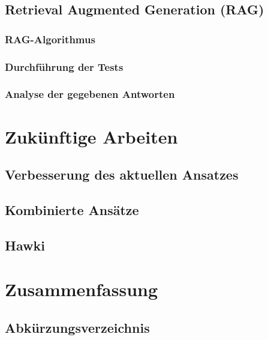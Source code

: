 \documentclass[german,report]{i1thesis}
\begin{document}
\subsection{Retrieval Augmented Generation (RAG)}%
\label{subsec:rag}




\subsubsection{RAG-Algorithmus}%
\label{subsec:rag-alg}

\subsubsection{Durchführung der Tests}%
\label{subsec:durchfuehrung-der-tests-rag}


\subsubsection{Analyse der gegebenen Antworten}%
\label{subsec:analyse-der-gegebenen-antworten-rag}



\section{Zukünftige Arbeiten}%
\label{sec:zukuenftige-arbeiten}

\subsection{Verbesserung des aktuellen Ansatzes}%
\label{subsec:verb}

\subsection{Kombinierte Ansätze}


\subsection{Hawki}%
\label{subsec:hawki}

\section{Zusammenfassung}%
\label{sec:zusammenfassung}


\newpage

\begin{center}
    \section*{Abkürzungsverzeichnis}
\end{center}
\end{document}
